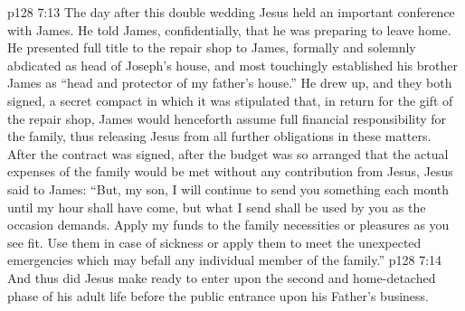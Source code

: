\pc \vs p128 7:13 The day after this double wedding Jesus held an important conference with James. He told James, confidentially, that he was preparing to leave home. He presented full title to the repair shop to James, formally and solemnly abdicated as head of Joseph’s house, and most touchingly established his brother James as “head and protector of my father’s house.” He drew up, and they both signed, a secret compact in which it was stipulated that, in return for the gift of the repair shop, James would henceforth assume full financial responsibility for the family, thus releasing Jesus from all further obligations in these matters. After the contract was signed, after the budget was so arranged that the actual expenses of the family would be met without any contribution from Jesus, Jesus said to James: \textcolor{ubdarkred}{“But, my son, I will continue to send you something each month until my hour shall have come, but what I send shall be used by you as the occasion demands. Apply my funds to the family necessities or pleasures as you see fit. Use them in case of sickness or apply them to meet the unexpected emergencies which may befall any individual member of the family.”}\plusone
\vs p128 7:14 And thus did Jesus make ready to enter upon the second and home\hyp{}detached phase of his adult life before the public entrance upon his Father’s business.
